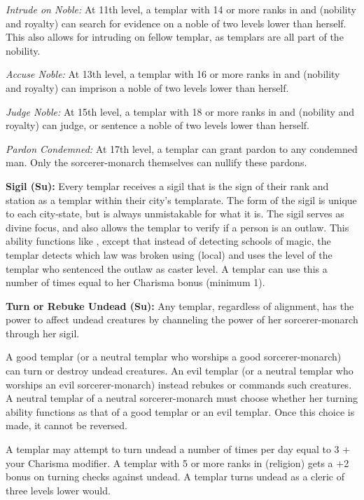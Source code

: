\textit{Intrude on Noble:} At 11th level, a templar with 14 or more ranks in  and  (nobility and royalty) can search for evidence on a noble of two levels lower than herself. This also allows for intruding on fellow templar, as templars are all part of the nobility.

\textit{Accuse Noble:} At 13th level, a templar with 16 or more ranks in  and  (nobility and royalty) can imprison a noble of two levels lower than herself.

\textit{Judge Noble:} At 15th level, a templar with 18 or more ranks in  and  (nobility and royalty) can judge, or sentence a noble of two levels lower than herself.

\textit{Pardon Condemned:} At 17th level, a templar can grant pardon to any condemned man. Only the sorcerer-monarch themselves can nullify these pardons.


\textbf{Sigil (Su):} Every templar receives a sigil that is the sign of their rank and station as a templar within their city's templarate. The form of the sigil is unique to each city-state, but is always unmistakable for what it is. The sigil serves as divine focus, and also allows the templar to verify if a person is an outlaw. This ability functions like , except that instead of detecting schools of magic, the templar detects which law was broken using  (local) and uses the level of the templar who sentenced the outlaw as caster level. A templar can use this a number of times equal to her Charisma bonus (minimum 1).


\textbf{Turn or Rebuke Undead (Su):} Any templar, regardless of alignment, has the power to affect undead creatures by channeling the power of her sorcerer-monarch through her sigil.

A good templar (or a neutral templar who worships a good sorcerer-monarch) can turn or destroy undead creatures. An evil templar (or a neutral templar who worships an evil sorcerer-monarch) instead rebukes or commands such creatures. A neutral templar of a neutral sorcerer-monarch must choose whether her turning ability functions as that of a good templar or an evil templar. Once this choice is made, it cannot be reversed.

A templar may attempt to turn undead a number of times per day equal to 3 + your Charisma modifier. A templar with 5 or more ranks in  (religion) gets a +2 bonus on turning checks against undead. A templar turns undead as a cleric of three levels lower would.

